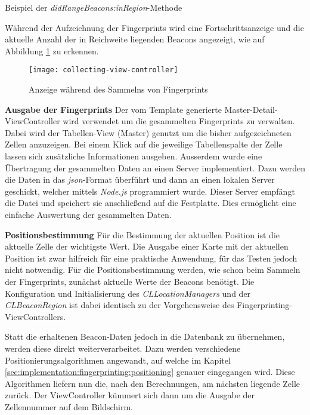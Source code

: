 \begin{listing}[htb!]
    \caption{Beispiel der \emph{didRangeBeacons:inRegion}-Methode}
    \label{lst:didRangeBeacons_objc}
\end{listing}

Während der Aufzeichnung der Fingerprints wird eine Fortschrittsanzeige und die aktuelle Anzahl der in Reichweite liegenden Beacons angezeigt, wie auf Abbildung \ref{collecting-view-controller} zu erkennen.

\begin{figure}[htb!]
		\centering
	\texttt{[image: collecting-view-controller]}
	\caption{Anzeige während des Sammelns von Fingerprints}
	\label{collecting-view-controller}
\end{figure}

\textbf{Ausgabe der Fingerprints}
Der vom Template generierte Master-Detail-ViewController wird verwendet um die gesammelten Fingerprints zu verwalten. Dabei wird der Tabellen-View (Master) genutzt um die bisher aufgezeichneten Zellen anzuzeigen. Bei einem Klick auf die jeweilige Tabellenspalte der Zelle lassen sich zusätzliche Informationen ausgeben.
Ausserdem wurde eine Übertragung der gesammelten Daten an einen Server implementiert. Dazu werden die Daten in das \emph{json}-Format überführt und dann an einen lokalen Server geschickt, welcher mittels \emph{Node.js} programmiert wurde. Dieser Server empfängt die Datei und speichert sie anschließend auf die Festplatte. 
Dies ermöglicht eine einfache Auswertung der gesammelten Daten.


\textbf{Positionsbestimmung}
Für die Bestimmung der aktuellen Position ist die aktuelle Zelle der wichtigste Wert. Die Ausgabe einer Karte mit der aktuellen Position ist zwar hilfreich für eine praktische Anwendung, für das Testen jedoch nicht notwendig.
Für die Positionsbestimmung werden, wie schon beim Sammeln der Fingerprints, zunächst aktuelle Werte der Beacons benötigt. Die Konfiguration und Initialisierung des \emph{CLLocationManagers} und der \emph{CLBeaconRegion} ist dabei identisch zu der Vorgehensweise des Fingerprinting-ViewControllers.

Statt die erhaltenen Beacon-Daten jedoch in die Datenbank zu übernehmen, werden diese direkt weiterverarbeitet. Dazu werden verschiedene Positionierungsalgorithmen angewandt, auf welche im Kapitel \ref{sec:implementation:fingerprinting:positioning} genauer eingegangen wird. 
Diese Algorithmen liefern nun die, nach den Berechnungen, am nächsten liegende Zelle zurück. Der ViewController kümmert sich dann um die Ausgabe der Zellennummer auf dem Bildschirm.


